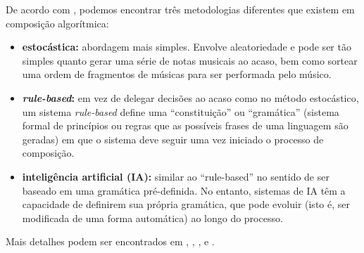 \documentclass{automatextcc}
\begin{document}
De acordo com \citet{maurer}, podemos encontrar três metodologias diferentes que existem em composição algorítmica: 
\begin{itemize}
    \item \textbf{estocástica:} abordagem mais simples. Envolve aleatoriedade e pode ser tão simples quanto gerar uma série de notas musicais ao acaso, bem como sortear uma ordem de fragmentos de músicas para ser performada pelo músico.
    \item \textbf{\textit{rule-based}:} em vez de delegar decisões ao acaso como no método estocástico, um sistema \textit{rule-based} define uma ``constituição'' ou ``gramática'' (sistema formal de princípios ou regras que as possíveis frases de uma linguagem são geradas) em que o sistema deve seguir uma vez iniciado o processo de composição. 
    \item \textbf{inteligência artificial (IA): }similar ao ``rule-based'' no sentido de ser baseado em uma gramática pré-definida. No entanto, sistemas de IA têm a capacidade de definirem sua própria gramática, que pode evoluir (isto é, ser modificada de uma forma automática) ao longo do processo.
\end{itemize}
Mais detalhes podem ser encontrados em \citet{alpern1995}, \citet{maurer}, \citet{nierhaus2009}, \citet{fernandez2013} e \citet{olivan2021}.  



\end{document}
